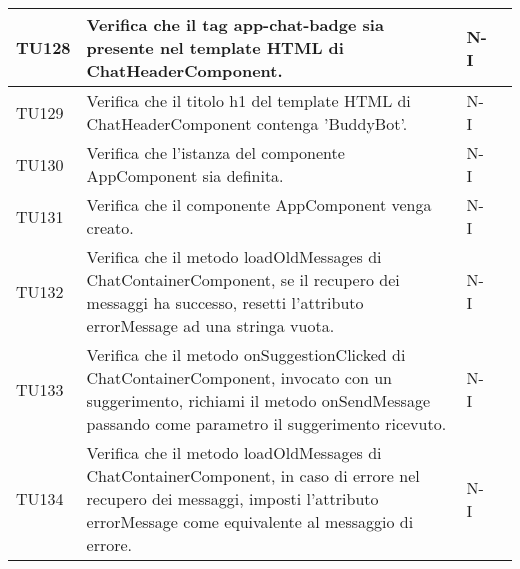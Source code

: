 \begin{table}[h!]
\begin{tabularx}{\textwidth}{|p{}|X|p{}|p{}|}
    TU128 & Verifica che il tag app-chat-badge sia presente nel template HTML di ChatHeaderComponent. &  N-I \\ \hline
    TU129 & Verifica che il titolo h1 del template HTML di ChatHeaderComponent contenga 'BuddyBot'. &  N-I \\ \hline
    TU130 & Verifica che l'istanza del componente AppComponent sia definita. &  N-I \\ \hline
    TU131 & Verifica che il componente AppComponent venga creato. &  N-I \\ \hline
    TU132 & Verifica che il metodo loadOldMessages di ChatContainerComponent, se il recupero dei messaggi ha successo, resetti l'attributo errorMessage ad una stringa vuota. &  N-I \\ \hline
    TU133 & Verifica che il metodo onSuggestionClicked di ChatContainerComponent, invocato con un suggerimento, richiami il metodo onSendMessage passando come parametro il suggerimento ricevuto. &  N-I \\ \hline
    TU134 & Verifica che il metodo loadOldMessages di ChatContainerComponent, in caso di errore nel recupero dei messaggi, imposti l'attributo errorMessage come equivalente al messaggio di errore. &  N-I \\ \hline

    \end{tabularx}
\end{table}

\newpage

